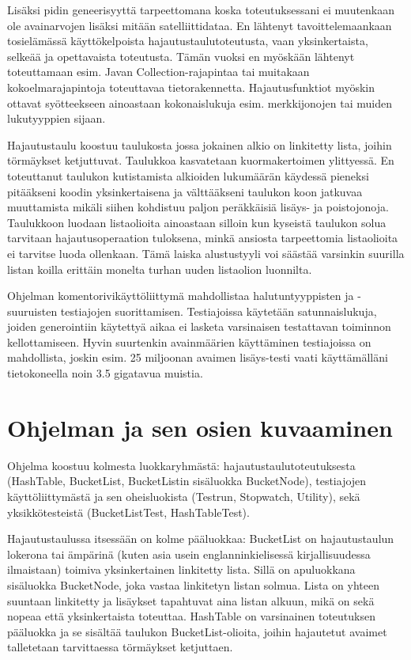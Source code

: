 \documentclass{itlaitos}
\begin{document}
Lisäksi pidin geneerisyyttä tarpeettomana koska toteutuksessani ei muutenkaan ole avainarvojen lisäksi mitään satelliittidataa. En lähtenyt tavoittelemaankaan tosielämässä käyttökelpoista hajautustaulutoteutusta, vaan yksinkertaista, selkeää ja opettavaista toteutusta. Tämän vuoksi en myöskään lähtenyt toteuttamaan esim. Javan Collection-rajapintaa tai muitakaan kokoelmarajapintoja toteuttavaa tietorakennetta. Hajautusfunktiot myöskin ottavat syötteekseen ainoastaan kokonaislukuja esim. merkkijonojen tai muiden lukutyyppien sijaan.

Hajautustaulu koostuu taulukosta jossa jokainen alkio on linkitetty lista, joihin törmäykset ketjuttuvat. Taulukkoa kasvatetaan kuormakertoimen ylittyessä. En toteuttanut taulukon kutistamista alkioiden lukumäärän käydessä pieneksi pitääkseni koodin yksinkertaisena ja välttääkseni taulukon koon jatkuvaa muuttamista mikäli siihen kohdistuu paljon peräkkäisiä lisäys- ja poistojonoja. Taulukkoon luodaan listaolioita ainoastaan silloin kun kyseistä taulukon solua tarvitaan hajautusoperaation tuloksena, minkä ansiosta tarpeettomia listaolioita ei tarvitse luoda ollenkaan. Tämä laiska alustustyyli voi säästää varsinkin suurilla listan koilla erittäin monelta turhan uuden listaolion luonnilta.

Ohjelman komentorivikäyttöliittymä mahdollistaa halutuntyyppisten ja -suuruisten testiajojen suorittamisen. Testiajoissa käytetään satunnaislukuja, joiden generointiin käytettyä aikaa ei lasketa varsinaisen testattavan toiminnon kellottamiseen. Hyvin suurtenkin avainmäärien käyttäminen testiajoissa on mahdollista, joskin esim. 25 miljoonan avaimen lisäys-testi vaati käyttämälläni tietokoneella noin 3.5 gigatavua muistia.

\section{Ohjelman ja sen osien kuvaaminen}

Ohjelma koostuu kolmesta luokkaryhmästä: hajautustaulutoteutuksesta (HashTable, BucketList, BucketListin sisäluokka BucketNode), testiajojen käyttöliittymästä ja sen oheisluokista (Testrun, Stopwatch, Utility), sekä yksikkötesteistä (BucketListTest, HashTableTest).

Hajautustaulussa itsessään on kolme pääluokkaa: BucketList on hajautustaulun lokerona tai ämpärinä (kuten asia usein englanninkielisessä kirjallisuudessa ilmaistaan) toimiva yksinkertainen linkitetty lista. Sillä on apuluokkana sisäluokka BucketNode, joka vastaa linkitetyn listan solmua. Lista on yhteen suuntaan linkitetty ja lisäykset tapahtuvat aina listan alkuun, mikä on sekä nopeaa että yksinkertaista toteuttaa. HashTable on varsinainen toteutuksen pääluokka ja se sisältää taulukon BucketList-olioita, joihin hajautetut avaimet talletetaan tarvittaessa törmäykset ketjuttaen.
\end{document}

